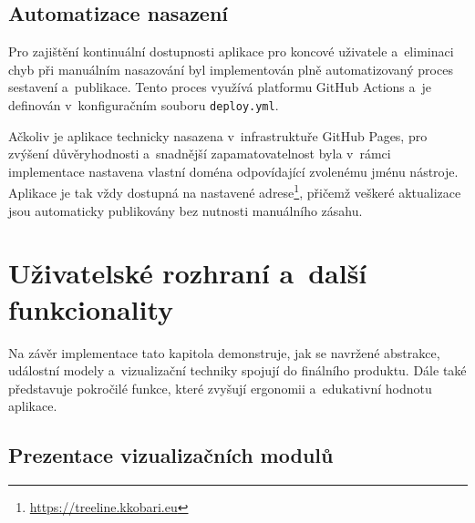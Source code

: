
\subsection{Automatizace nasazení}
\label{subsec:implementation-cicd}

Pro zajištění kontinuální dostupnosti aplikace pro koncové uživatele a~eliminaci chyb při manuálním nasazování byl implementován plně automatizovaný proces sestavení a~publikace.
Tento proces využívá platformu \mbox{GitHub} Actions a~je definován v~konfiguračním souboru \texttt{deploy.yml}.

Ačkoliv je aplikace technicky nasazena v~infrastruktuře \mbox{GitHub} Pages, pro zvýšení důvěryhodnosti a~snadnější zapamatovatelnost byla v~rámci implementace nastavena vlastní doména odpovídající zvolenému jménu nástroje.
Aplikace je tak vždy dostupná na nastavené adrese\footnote{\href{https://treeline.kkobari.eu}{https://treeline.kkobari.eu}}, přičemž veškeré aktualizace jsou automaticky publikovány bez nutnosti manuálního zásahu.

\section{Uživatelské rozhraní a~další funkcionality}
\label{sec:ui-and-advanced-features}

Na závěr implementace tato kapitola demonstruje, jak se navržené abstrakce, událostní modely a~vizualizační techniky spojují do finálního produktu.
Dále také představuje pokročilé funkce, které zvyšují ergonomii a~edukativní hodnotu aplikace.

\subsection{Prezentace vizualizačních modulů}
\label{subsec:showcase}

